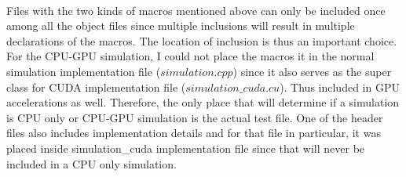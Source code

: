 \documentclass[../thesis.tex]{subfiles}
\begin{document}
\\
Files with the two kinds of macros mentioned above can only be included once among all the object files since multiple inclusions will result in multiple declarations of the macros. The location of inclusion is thus an important choice. For the CPU-GPU simulation, I could not place the macros it in the normal simulation implementation file ($simulation.cpp$) since it also serves as the super class for CUDA implementation file ($simulation\_cuda.cu$). Thus included in GPU accelerations as well. Therefore, the only place that will determine if a simulation is CPU only or CPU-GPU simulation is the actual test file. One of the header files also includes implementation details and for that file in particular, it was placed inside simulation\_cuda implementation file since that will never be included in a CPU only simulation.
\end{document}
